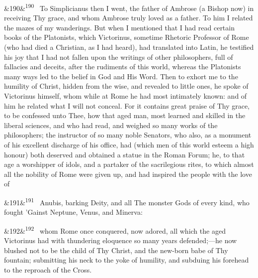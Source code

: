 \documentclass[12pt]{article}
\newcommand{\para}[1][]{\par\noindent\ifx&#1&\else\textsuperscript{\footnotesize #1}~\fi}
\begin{document}
\para[190] To Simplicianus then I went, the father of Ambrose (a Bishop now) in receiving Thy grace, and whom Ambrose truly loved as a father. To him I related the mazes of my wanderings. But when I mentioned that I had read certain books of the Platonists, which Victorinus, sometime Rhetoric Professor of Rome (who had died a Christian, as I had heard), had translated into Latin, he testified his joy that I had not fallen upon the writings of other philosophers, full of fallacies and deceits, after the rudiments of this world, whereas the Platonists many ways led to the belief in God and His Word. Then to exhort me to the humility of Christ, hidden from the wise, and revealed to little ones, he spoke of Victorinus himself, whom while at Rome he had most intimately known: and of him he related what I will not conceal. For it contains great praise of Thy grace, to be confessed unto Thee, how that aged man, most learned and skilled in the liberal sciences, and who had read, and weighed so many works of the philosophers; the instructor of so many noble Senators, who also, as a monument of his excellent discharge of his office, had (which men of this world esteem a high honour) both deserved and obtained a statue in the Roman Forum; he, to that age a worshipper of idols, and a partaker of the sacrilegious rites, to which almost all the nobility of Rome were given up, and had inspired the people with the love of

\para[191] Anubis, barking Deity, and all The monster Gods of every kind, who fought 'Gainst Neptune, Venus, and Minerva:

\para[192] whom Rome once conquered, now adored, all which the aged Victorinus had with thundering eloquence so many years defended;---he now blushed not to be the child of Thy Christ, and the new-born babe of Thy fountain; submitting his neck to the yoke of humility, and subduing his forehead to the reproach of the Cross.
\end{document}
